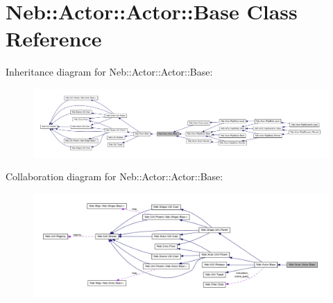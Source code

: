 \hypertarget{classNeb_1_1Actor_1_1Actor_1_1Base}{\section{\-Neb\-:\-:\-Actor\-:\-:\-Actor\-:\-:\-Base \-Class \-Reference}
\label{classNeb_1_1Actor_1_1Actor_1_1Base}
}


\-Inheritance diagram for \-Neb\-:\-:\-Actor\-:\-:\-Actor\-:\-:\-Base\-:\nopagebreak
\begin{figure}[H]
\begin{center}
\leavevmode
\includegraphics[width=350pt]{classNeb_1_1Actor_1_1Actor_1_1Base__inherit__graph}
\end{center}
\end{figure}


\-Collaboration diagram for \-Neb\-:\-:\-Actor\-:\-:\-Actor\-:\-:\-Base\-:\nopagebreak
\begin{figure}[H]
\begin{center}
\leavevmode
\includegraphics[width=350pt]{classNeb_1_1Actor_1_1Actor_1_1Base__coll__graph}
\end{center}
\end{figure}
